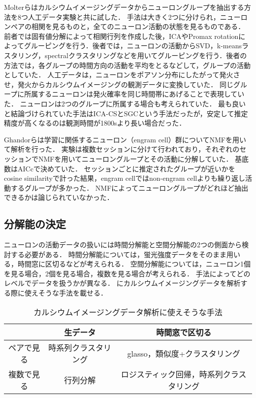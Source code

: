 Molterらはカルシウムイメージングデータからニューロングループを抽出する方法を8つ人工データ実験と共に試した\cite{Molter2018}．
手法は大きく2つに分けられ，ニューロンペアの相関を見るものと，全てのニューロン活動の状態を見るものである．
前者では固有値分解によって相関行列を作成した後，ICAやPromax rotationによってグルーピングを行う．後者では，ニューロンの活動からSVD，k-meansラスタリング，spectralクラスタリングなどを用いてグルーピングを行う．後者の方法では，各グループの時間方向の活動を平均をとるなどして，グループの活動としていた．
人工データは，ニューロンをポアソン分布にしたがって発火させ，発火からカルシウムイメージングの観測データに変換していた．
同じグループに所属するニューロンは発火確率を同じ時間帯にあげることで表現していた．
ニューロンは2つのグループに所属する場合も考えられていた．
最も良いと結論づけられていた手法はICA-CSとSGCという手法だったが，安定して推定精度が高くなるのは観測時間が1800sより長い場合だった．

Ghandorらは学習に関係するニューロン（engram cell）群についてNMFを用いて解析を行った\cite{Ghandour2019}．
実験は複数セッションに分けて行われており，それぞれのセッションでNMFを用いてニューロングループとその活動に分解していた．
基底数はAICcで決めていた．
セッションごとに推定されたグループが近いかをcosine similarityで計った結果，engram cellではnon-engram cellよりも繰り返し活動するグループが多かった．
NMFによってニューロングループがどれほど抽出できるかは論じられていなかった．

\subsection{分解能の決定}
ニューロンの活動データの扱いには時間分解能と空間分解能の2つの側面から検討する必要がある．
時間分解能については，蛍光強度データをそのまま用いる，時間窓に区切るなどが考えられる．
空間分解能については，ニューロン1個を見る場合，2個を見る場合，複数を見る場合が考えられる．
手法によってどのレベルでデータを扱うかが異なる．
にカルシウムイメージングデータを解析する際に使えそうな手法を載せる．

\begin{table}[htb]
  \center
  \begin{tabular}{|c|cc|} \hline
    & 生データ & 時間窓で区切る \\ \hline
    ペアで見る & 時系列クラスタリング & glasso，類似度+クラスタリング\\
	  複数で見る & 行列分解 & ロジスティック回帰，時系列クラスタリング \\ \hline
  \end{tabular}
  \caption{カルシウムイメージングデータ解析に使えそうな手法}
  \label{tab:methods}
\end{table}

